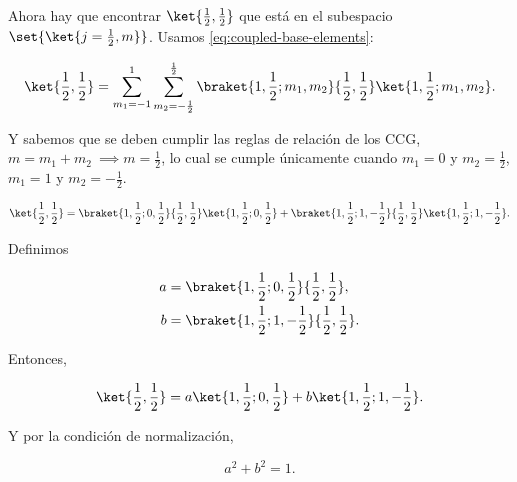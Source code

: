 \documentclass[./../main.tex]{subfiles}
\begin{document}
\begin{exercise}
\begin{enumerate}[label=(\alph*)]
\begin{solution}
                Ahora hay que encontrar \(\ket{\frac{1}{2}, \frac{1}{2}}\) que está en el subespacio \(\set{\ket{j = \frac{1}{2}, m}}\). Usamos \cref{eq:coupled-base-elements}:

                \begin{equation}
                    \ket{\frac{1}{2}, \frac{1}{2}} = \sum_{m_{1} = -1}^{1}\sum_{m_{2} = -\frac{1}{2}}^{\frac{1}{2}}\braket{1, \frac{1}{2}; m_{1}, m_{2}}{\frac{1}{2}, \frac{1}{2}}\ket{1, \frac{1}{2}; m_{1}, m_{2}}.
                    \label{eq:coupled-elements-2nd-subspace}
                \end{equation}

                Y sabemos que se deben cumplir las reglas de relación de los CCG, \(m = m_{1} + m_{2}\ \implies m = \frac{1}{2}\), lo cual se cumple únicamente cuando \(m_{1} = 0\) y \(m_{2} = \frac{1}{2}\), \(m_{1} = 1\) y \(m_{2} = -\frac{1}{2}\).

                \begin{equation*}
                    \ket{\frac{1}{2}, \frac{1}{2}} = \braket{1, \frac{1}{2}; 0, \frac{1}{2}}{\frac{1}{2}, \frac{1}{2}}\ket{1, \frac{1}{2}; 0, \frac{1}{2}} + \braket{1, \frac{1}{2}; 1, -\frac{1}{2}}{\frac{1}{2}, \frac{1}{2}}\ket{1, \frac{1}{2}; 1, -\frac{1}{2}}.
                \end{equation*}

                Definimos
                
                \begin{align*}
                    a &= \braket{1, \frac{1}{2}; 0, \frac{1}{2}}{\frac{1}{2}, \frac{1}{2}},\\
                    b &= \braket{1, \frac{1}{2}; 1, -\frac{1}{2}}{\frac{1}{2}, \frac{1}{2}}.
                \end{align*}

                Entonces,

                \begin{equation}
                    \ket{\frac{1}{2}, \frac{1}{2}} = a\ket{1, \frac{1}{2}; 0, \frac{1}{2}} + b\ket{1, \frac{1}{2}; 1, -\frac{1}{2}}.
                    \label{eq:1212-substitute-CCG}
                \end{equation}

                Y por la condición de normalización,

                \begin{equation}
                    a^{2} + b^{2} = 1.
                    \label{eq:normalization-condition-1212-CCG}
                \end{equation}


\end{solution}
\end{enumerate}
\end{exercise}
\end{document}
